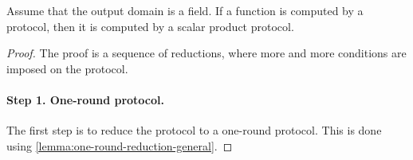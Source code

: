 \begin{lemma}\label{lem:scalar-product-reduction}
    Assume that the output domain is a field. 
    If a function is computed by a protocol, then it is computed by a scalar product protocol.
\end{lemma}
\begin{proof}
    The proof is a sequence of reductions, where more and more conditions are imposed on the protocol.  
    
    \paragraph*{Step 1. One-round protocol.} The first step is to reduce the protocol to a one-round protocol. This is done using \cref{lemma:one-round-reduction-general}.




\end{proof}
